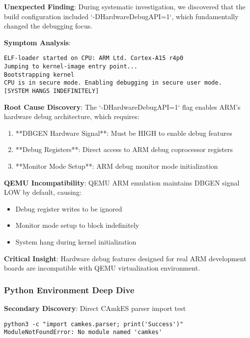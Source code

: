 \documentclass[11pt,a4paper]{article}
\begin{document}
\textbf{Unexpected Finding}: During systematic investigation, we discovered that the build configuration included `-DHardwareDebugAPI=1`, which fundamentally changed the debugging focus.

\textbf{Symptom Analysis}:
\begin{lstlisting}[caption=System Hang After Debug Enable]
ELF-loader started on CPU: ARM Ltd. Cortex-A15 r4p0
Jumping to kernel-image entry point...
Bootstrapping kernel
CPU is in secure mode. Enabling debugging in secure user mode.
[SYSTEM HANGS INDEFINITELY]
\end{lstlisting}

\textbf{Root Cause Discovery}: The `-DHardwareDebugAPI=1` flag enables ARM's hardware debug architecture, which requires:

\begin{enumerate}
\item **DBGEN Hardware Signal**: Must be HIGH to enable debug features
\item **Debug Registers**: Direct access to ARM debug coprocessor registers  
\item **Monitor Mode Setup**: ARM debug monitor mode initialization
\end{enumerate}

\textbf{QEMU Incompatibility}: QEMU ARM emulation maintains DBGEN signal LOW by default, causing:
\begin{itemize}
\item Debug register writes to be ignored
\item Monitor mode setup to block indefinitely
\item System hang during kernel initialization
\end{itemize}

\textbf{Critical Insight}: Hardware debug features designed for real ARM development boards are incompatible with QEMU virtualization environment.

\subsubsection{Python Environment Deep Dive}

\textbf{Secondary Discovery}: Direct CAmkES parser import test
\begin{lstlisting}[caption=Python Environment Test]
python3 -c "import camkes.parser; print('Success')"
ModuleNotFoundError: No module named 'camkes'
\end{lstlisting}
\end{document}
